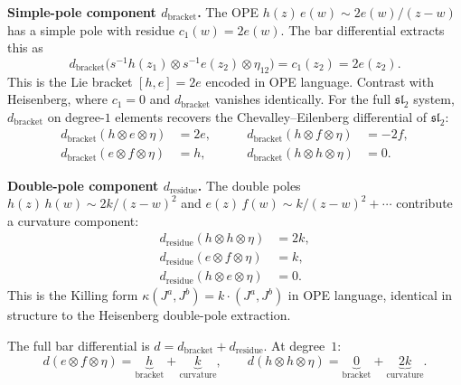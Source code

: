 \medskip\noindent\textbf{Simple-pole component $d_{\mathrm{bracket}}$.}
The OPE $h(z)\,e(w) \sim 2e(w)/(z-w)$ has a simple pole with
residue $c_1(w) = 2e(w)$. The bar differential extracts this as
\begin{equation}\label{eq:frame-sl2-dbracket-deg1}
d_{\mathrm{bracket}}\bigl(
 s^{-1}h(z_1) \otimes s^{-1}e(z_2) \otimes \eta_{12}
\bigr)
= c_1(z_2) = 2e(z_2).
\end{equation}
This is the Lie bracket $[h, e] = 2e$ encoded in OPE language.
Contrast with Heisenberg, where $c_1 = 0$ and $d_{\mathrm{bracket}}$
vanishes identically. For the full $\mathfrak{sl}_2$ system,
$d_{\mathrm{bracket}}$ on degree-$1$ elements recovers the
Chevalley--Eilenberg differential of $\mathfrak{sl}_2$:
\begin{equation}\label{eq:frame-sl2-ce-table}
\begin{aligned}
d_{\mathrm{bracket}}(h \otimes e \otimes \eta) &= 2e, &\qquad
d_{\mathrm{bracket}}(h \otimes f \otimes \eta) &= -2f, \\
d_{\mathrm{bracket}}(e \otimes f \otimes \eta) &= h, &\qquad
d_{\mathrm{bracket}}(h \otimes h \otimes \eta) &= 0.
\end{aligned}
\end{equation}

\medskip\noindent\textbf{Double-pole component $d_{\mathrm{residue}}$.}
The double poles $h(z)\,h(w) \sim 2k/(z-w)^2$ and
$e(z)\,f(w) \sim k/(z-w)^2 + \cdots$ contribute a curvature component:
\begin{equation}\label{eq:frame-sl2-dresid-deg1}
\begin{aligned}
d_{\mathrm{residue}}(h \otimes h \otimes \eta) &= 2k, \\
d_{\mathrm{residue}}(e \otimes f \otimes \eta) &= k, \\
d_{\mathrm{residue}}(h \otimes e \otimes \eta) &= 0.
\end{aligned}
\end{equation}
This is the Killing form $\kappa(J^a, J^b) = k \cdot (J^a, J^b)$
in OPE language, identical in structure to the Heisenberg double-pole
extraction.

The full bar differential is $d = d_{\mathrm{bracket}} + d_{\mathrm{residue}}$.
At degree~$1$:
\begin{equation}\label{eq:frame-sl2-full-d-deg1}
d(e \otimes f \otimes \eta) = \underbrace{h}_{\text{bracket}} + \underbrace{k}_{\text{curvature}}, \qquad
d(h \otimes h \otimes \eta) = \underbrace{0}_{\text{bracket}} + \underbrace{2k}_{\text{curvature}}.
\end{equation}

